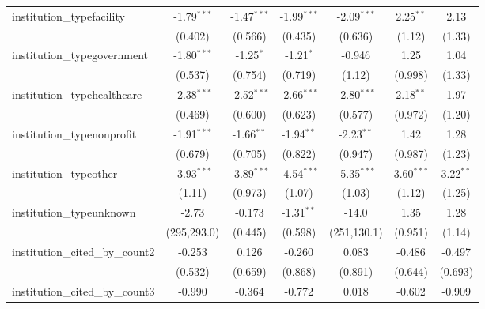 \begin{tabular}{lcccccc}
   institution\_typefacility             & -1.79$^{***}$ & -1.47$^{***}$ & -1.99$^{***}$ & -2.09$^{***}$ & 2.25$^{**}$   & 2.13\\   
                                         & (0.402)       & (0.566)       & (0.435)       & (0.636)       & (1.12)        & (1.33)\\   
   institution\_typegovernment           & -1.80$^{***}$ & -1.25$^{*}$   & -1.21$^{*}$   & -0.946        & 1.25          & 1.04\\   
                                         & (0.537)       & (0.754)       & (0.719)       & (1.12)        & (0.998)       & (1.33)\\   
   institution\_typehealthcare           & -2.38$^{***}$ & -2.52$^{***}$ & -2.66$^{***}$ & -2.80$^{***}$ & 2.18$^{**}$   & 1.97\\   
                                         & (0.469)       & (0.600)       & (0.623)       & (0.577)       & (0.972)       & (1.20)\\   
   institution\_typenonprofit            & -1.91$^{***}$ & -1.66$^{**}$  & -1.94$^{**}$  & -2.23$^{**}$  & 1.42          & 1.28\\   
                                         & (0.679)       & (0.705)       & (0.822)       & (0.947)       & (0.987)       & (1.23)\\   
   institution\_typeother                & -3.93$^{***}$ & -3.89$^{***}$ & -4.54$^{***}$ & -5.35$^{***}$ & 3.60$^{***}$  & 3.22$^{**}$\\   
                                         & (1.11)        & (0.973)       & (1.07)        & (1.03)        & (1.12)        & (1.25)\\   
   institution\_typeunknown              & -2.73         & -0.173        & -1.31$^{**}$  & -14.0         & 1.35          & 1.28\\   
                                         & (295,293.0)   & (0.445)       & (0.598)       & (251,130.1)   & (0.951)       & (1.14)\\   
   institution\_cited\_by\_count2        & -0.253        & 0.126         & -0.260        & 0.083         & -0.486        & -0.497\\   
                                         & (0.532)       & (0.659)       & (0.868)       & (0.891)       & (0.644)       & (0.693)\\   
   institution\_cited\_by\_count3        & -0.990        & -0.364        & -0.772        & 0.018         & -0.602        & -0.909\\   

\end{tabular}
